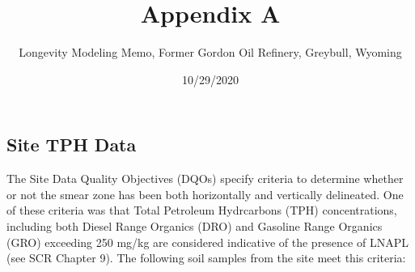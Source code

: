 \documentclass[
]{article}
\title{Appendix A}
\author{Longevity Modeling Memo, Former Gordon Oil Refinery, Greybull, Wyoming}
\date{10/29/2020}
\begin{document}
\maketitle

\hypertarget{site-tph-data}{%
\subsection{Site TPH Data}\label{site-tph-data}}

The Site Data Quality Objectives (DQOs) specify criteria to determine
whether or not the smear zone has been both horizontally and vertically
delineated. One of these criteria was that Total Petroleum Hydrcarbons
(TPH) concentrations, including both Diesel Range Organics (DRO) and
Gasoline Range Organics (GRO) exceeding 250 mg/kg are considered
indicative of the presence of LNAPL (see SCR Chapter 9). The following
soil samples from the site meet this criteria:
\end{document}
